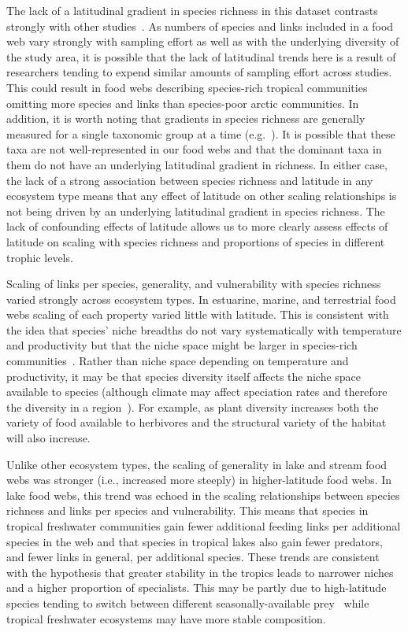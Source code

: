 \documentclass[12pt]{article}
\begin{document}
\begin{spacing}{1.0}
  The lack of a latitudinal gradient in species richness in this dataset contrasts
  strongly with other studies~\citep{Schemske2009a,Macpherson2002,Kaufman1995}. As numbers of species and links included in a food web
  vary strongly with sampling effort as well as with the underlying diversity of the study
  area, it is possible that the lack of latitudinal trends here is a result of researchers
  tending to expend similar amounts of sampling effort across studies. This could result in
  food webs describing species-rich tropical communities omitting more species and links
  than species-poor arctic communities. In addition, it is worth noting that gradients in
  species richness are generally measured for a single taxonomic group at a time (e.g.~\citep{Kaufman1995}).
  It is possible that these taxa are not well-represented in our food webs and that the
  dominant taxa in them do not have an underlying latitudinal gradient in richness. 
  In either case, the lack of a strong association between
  species richness and latitude in any ecosystem type
  means that any effect of latitude on other scaling 
  relationships is not being driven by an underlying 
  latitudinal gradient in species richness.
  The lack of confounding effects of latitude allows us to 
  more clearly assess effects of latitude on scaling with 
  species richness and proportions of species in different 
  trophic levels.


  Scaling of links per species, generality, and vulnerability with species
  richness varied strongly across ecosystem types. In estuarine, marine, and
  terrestrial food webs scaling of each property varied little with latitude.
  This is consistent with the idea that species' niche breadths do not vary
  systematically with temperature and productivity but that the niche space
  might be larger in species-rich communities~\citep{Davies2007}. Rather than
  niche space depending on temperature and productivity, it may be that species
  diversity itself affects the niche space available to species (although climate
  may affect speciation rates and therefore the diversity in a region~\citep{Currie2004}). 
  For example, as plant diversity increases both the 
  variety of food available to herbivores and the structural variety of the habitat will also increase.


  Unlike other ecosystem types, the scaling of generality
  in lake and stream food webs was stronger (i.e., 
  increased more steeply) in higher-latitude food webs. 
  In lake food webs, this trend was echoed in the scaling relationships
  between species richness and links per species and vulnerability.
  This means that species in tropical freshwater
  communities gain fewer additional feeding links per additional species in the
  web and that species in tropical lakes also gain fewer predators, and fewer links
  in general, per additional species. These trends are consistent with the hypothesis
  that greater stability in the tropics leads to narrower niches~\citep{Vazquez2004} and a higher proportion of
  specialists. This may be partly due to high-latitude species
  tending to switch between different seasonally-available
  prey~\citep{Isaac2012,Wilhelm1999} while tropical freshwater ecosystems may have more stable composition.



\end{spacing}
\end{document}
